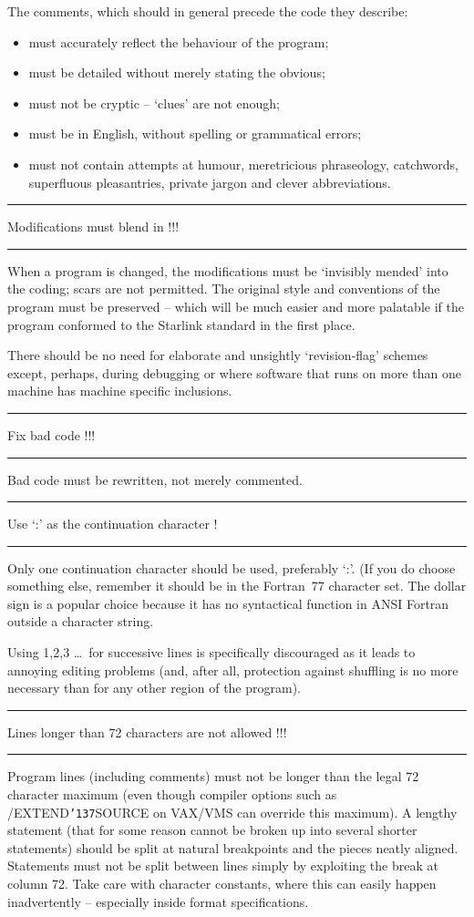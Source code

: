 \documentclass[twoside,11pt]{article}
\newcounter{sruleno}
\newcommand{\srule}[1]{
    \addtocounter{sruleno}{1}
    \goodbreak
    \rule[0.5ex]{\textwidth}{0.3mm}
    {\Large #1 \hfill {\thesruleno}}
    \rule[0.5ex]{\textwidth}{0.1mm}
}
\newcommand{\srule}[1]{
       \addtocounter{sruleno}{1}
       \begin{rawhtml} <HR> \end{rawhtml}
       {\Large \thesruleno}~~~~{\Large #1}
       \begin{rawhtml} <HR> \end{rawhtml}
       \end{tabular}
  }
\renewcommand{\_}{{\tt\char'137}}
\begin{document}
The comments, which should in general precede the code they
describe:
\begin{itemize}
\item must accurately reflect the behaviour of the program;
\item must be detailed without merely stating the obvious;
\item must not be cryptic -- `clues' are not enough;
\item must be in English, without spelling or grammatical errors;
\item must not contain attempts at humour, meretricious
phraseology, catchwords, superfluous pleasantries, private jargon
and clever abbreviations.
\end{itemize}

\srule{Modifications must blend in !!!}
When a program is changed, the modifications must be `invisibly mended' into the
coding;
scars are not permitted.
The original style and conventions of the program must be
preserved -- which will
be much easier and more palatable if the program conformed to the Starlink
standard in the first place.

There should be no need for elaborate and unsightly `revision-flag' schemes
except, perhaps, during debugging or where software that runs on more than one
machine has machine specific inclusions.

\srule{Fix bad code !!!}
Bad code must be rewritten, not merely commented.

\srule{Use `:' as the continuation character !}
Only one continuation character should be used, preferably `:'.  (If
you do choose something else, remember
it should be in the Fortran~77 character set. The dollar sign is
a popular choice because it has no syntactical function in ANSI Fortran
outside a character string.

Using 1,2,3 \ldots\ for successive lines is specifically discouraged as it leads
to annoying editing problems (and, after all, protection against shuffling is no
more necessary than for any other region of the program).

\srule{Lines longer than 72 characters are not allowed !!!}
Program lines (including comments)
must not be longer than the legal 72 character maximum (even though
compiler options such as /EXTEND\_SOURCE on VAX/VMS can override this
maximum).
A lengthy statement (that for some reason cannot be broken up into several
shorter statements) should be split at natural breakpoints and the pieces
neatly aligned.
Statements must not be split between lines simply by exploiting the break at
column 72.  Take care with character constants, where this can easily
happen inadvertently -- especially inside format specifications.
\end{document}
